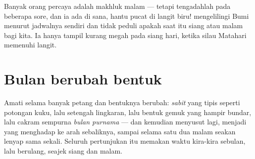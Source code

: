 \begin{remark}\label{rem:g2:moon-in-the-sky:daytime}
Banyak orang percaya  adalah makhluk malam --- tetapi tengadahlah
pada beberapa sore, dan ia ada di sana, hantu pucat di langit biru!
 mengelilingi Bumi menurut jadwalnya sendiri dan tidak peduli
apakah saat itu siang atau malam bagi kita. Ia hanya tampil kurang
megah pada siang hari, ketika silau Matahari memenuhi langit.
\end{remark}

\section{Bulan berubah bentuk}

\begin{example}\label{ex:g2:moon-in-the-sky:shapes}
Amati  selama banyak petang dan bentuknya berubah:
\emph{sabit} yang tipis seperti potongan kuku, lalu
setengah lingkaran, lalu bentuk gemuk yang hampir bundar, lalu cakram
sempurna \emph{bulan purnama} --- dan kemudian
menyusut lagi, menjadi  yang menghadap ke arah sebaliknya, sampai
selama satu dua malam  seakan lenyap sama sekali. Seluruh
pertunjukan itu memakan waktu kira-kira sebulan, lalu berulang, seajek
siang dan malam.
\end{example}

